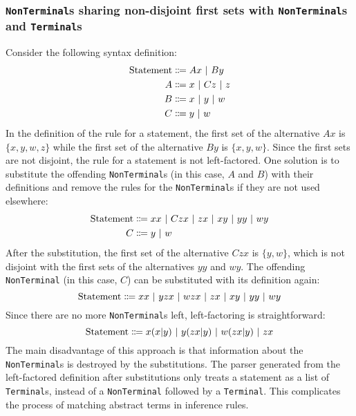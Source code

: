 \subsubsection{\texorpdfstring{\lstinline{NonTerminal}}{NonTerminal}s sharing non-disjoint first sets with \texorpdfstring{\lstinline{NonTerminal}}{NonTerminal}s and \mbox{\texorpdfstring{\lstinline{Terminal}}{Terminal}s}}
\label{syntax:factorisation:nonterm}
Consider the following syntax definition:
\begin{align*}
    \text{Statement} &\Coloneqq Ax \ |\  By \\
    A &\Coloneqq x \ |\  Cz \ |\  z \\
    B &\Coloneqq x \ |\  y \ |\  w \\
    C &\Coloneqq y \ |\  w
\end{align*}
In the definition of the rule for a statement, the first set of the alternative $Ax$ is $\{ x, y, w, z \}$ while the first set of the alternative $By$ is $\{ x, y, w \}$. Since the first sets are not disjoint, the rule for a statement is not left-factored. One solution is to substitute the offending \lstinline{NonTerminal}s (in this case, $A$ and $B$) with their definitions and remove the rules for the \lstinline{NonTerminal}s if they are not used elsewhere:
\begin{align*}
    \text{Statement} &\Coloneqq xx \ |\  Czx \ |\  zx \ |\  xy \ |\  yy \ |\  wy \\
    C &\Coloneqq y \ |\  w
\end{align*}
After the substitution, the first set of the alternative $Czx$ is $\{ y, w \}$, which is not disjoint with the first sets of the alternatives $yy$ and $wy$. The offending \lstinline{NonTerminal} (in this case, $C$) can be substituted with its definition again:
\[
    \text{Statement} \Coloneqq xx \ |\  yzx \ |\  wzx \ |\  zx \ |\  xy \ |\  yy \ |\  wy
\]
Since there are no more \lstinline{NonTerminal}s left, left-factoring is straightforward:
\[
    \text{Statement} \Coloneqq x(x|y) \ |\  y(zx|y) \ |\  w(zx|y) \ |\  zx
\]
The main disadvantage of this approach is that information about the \lstinline{NonTerminal}s is destroyed by the substitutions. The parser generated from the left-factored definition after substitutions only treats a statement as a list of \lstinline{Terminal}s, instead of a \lstinline{NonTerminal} followed by a \lstinline{Terminal}. This complicates the process of matching abstract terms in inference rules.


